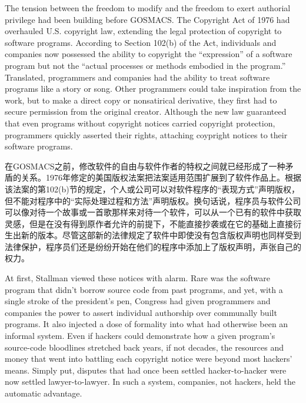 \ifdefined\eng
The tension between the freedom to modify and the freedom to exert authorial privilege had been building before GOSMACS. The Copyright Act of 1976 had overhauled U.S. copyright law, extending the legal protection of copyright to software programs. According to Section 102(b) of the Act, individuals and companies now possessed the ability to copyright the ``expression'' of a software program but not the ``actual processes or methods embodied in the program.'' Translated, programmers and companies had the ability to treat software programs like a story or song. Other programmers could take inspiration from the work, but to make a direct copy or nonsatirical derivative, they first had to secure permission from the original creator. Although the new law guaranteed that even programs without copyright notices carried copyright protection, programmers quickly asserted their rights, attaching coypright notices to their software programs.
\fi

\ifdefined\chs
在GOSMACS之前，修改软件的自由与软件作者的特权之间就已经形成了一种矛盾的关系。1976年修定的美国版权法案把法案适用范围扩展到了软件作品上。根据该法案的第102(b)节的规定，个人或公司可以对软件程序的``表现方式''声明版权，但不能对程序中的``实际处理过程和方法''声明版权。换句话说，程序员与软件公司可以像对待一个故事或一首歌那样来对待一个软件，可以从一个已有的软件中获取灵感，但是在没有得到原作者允许的前提下，不能直接抄袭或在它的基础上直接衍生出新的版本。尽管这部新的法律规定了软件中即使没有包含版权声明也同样受到法律保护，程序员们还是纷纷开始在他们的程序中添加上了版权声明，声张自己的权力。
\fi

\ifdefined\eng
At first, Stallman viewed these notices with alarm. Rare was the software program that didn't borrow source code from past programs, and yet, with a single stroke of the president's pen, Congress had given programmers and companies the power to assert individual authorship over communally built programs. It also injected a dose of formality into what had otherwise been an informal system. Even if hackers could demonstrate how a given program's source-code bloodlines stretched back years, if not decades, the resources and money that went into battling each copyright notice were beyond most hackers' means. Simply put, disputes that had once been settled hacker-to-hacker were now settled lawyer-to-lawyer. In such a system, companies, not hackers, held the automatic advantage.
\fi

